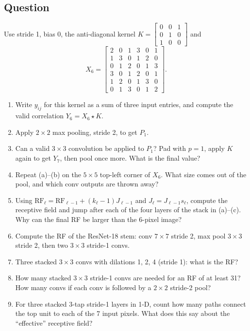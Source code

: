 \documentclass[12pt,a4paper]{article}
\begin{document}
\subsection*{Question}
Use stride 1, bias 0, the anti-diagonal kernel $K=\begin{bmatrix}0&0&1\\0&1&0\\1&0&0\end{bmatrix}$ and
\[
X_6=\begin{bmatrix}2&0&1&3&0&1\\1&3&0&1&2&0\\0&1&2&0&1&3\\3&0&1&2&0&1\\1&2&0&1&3&0\\0&1&3&0&1&2\end{bmatrix}.
\]
\begin{enumerate}[label=(\alph*)]
\item Write $y_{ij}$ for this kernel as a sum of three input entries, and compute the valid correlation $Y_6=X_6\star K$.
\item Apply $2\times2$ max pooling, stride 2, to get $P_1$.
\item Can a valid $3\times3$ convolution be applied to $P_1$? Pad with $p=1$, apply $K$ again to get $Y_7$, then pool once more. What is the final value?
\item Repeat (a)--(b) on the $5\times5$ top-left corner of $X_6$. What size comes out of the pool, and which conv outputs are thrown away?
\item Using $\mathrm{RF}_\ell=\mathrm{RF}_{\ell-1}+(k_\ell-1)J_{\ell-1}$ and $J_\ell=J_{\ell-1}s_\ell$, compute the receptive field and jump after each of the four layers of the stack in (a)--(c). Why can the final RF be larger than the 6-pixel image?
\item Compute the RF of the ResNet-18 stem: conv $7\times7$ stride 2, max pool $3\times3$ stride 2, then two $3\times3$ stride-1 convs.
\item Three stacked $3\times3$ convs with dilations 1, 2, 4 (stride 1): what is the RF?
\item How many stacked $3\times3$ stride-1 convs are needed for an RF of at least 31? How many convs if each conv is followed by a $2\times2$ stride-2 pool?
\item For three stacked 3-tap stride-1 layers in 1-D, count how many paths connect the top unit to each of the 7 input pixels. What does this say about the ``effective'' receptive field?
\end{enumerate}
\end{document}
